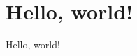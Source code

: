 \documentclass[draft,12pt,a4paper]{article}
\title{}
\author{}
\begin{document}
\maketitle{}

\begin{abstract}
  
\end{abstract}
\clearpage

\tableofcontents
\listoffigures{}
\listoftables{}
\clearpage
{}

\section{Hello, world!}
\label{sec:hello-world}

Hello, world!
\end{document}
